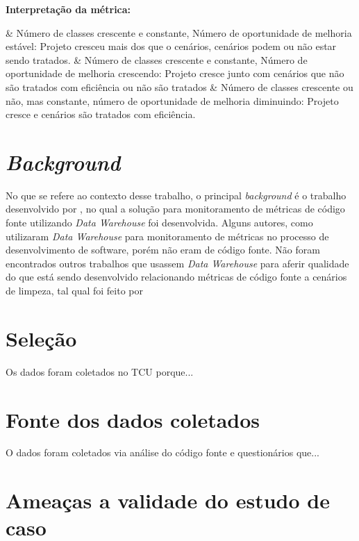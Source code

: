 \textbf{Interpretação da métrica: } 

\begin{easylist}[itemize]	
	& Número de classes crescente e constante, Número de oportunidade de melhoria estável: Projeto cresceu mais dos 	que o cenários, cenários podem ou não estar sendo tratados.
	& Número de classes crescente e constante, Número de oportunidade de melhoria crescendo: Projeto cresce junto 		com cenários que não são tratados com eficiência ou não são tratados
	& Número de classes crescente ou não, mas constante, número de oportunidade de melhoria diminuindo: Projeto 		cresce e cenários são tratados com eficiência.	
	\end{easylist}	

\section{\textit{Background}}

No que se refere ao contexto desse trabalho, o principal \textit{background} é o trabalho desenvolvido por , no qual a solução para monitoramento de métricas de código fonte utilizando \textit{Data Warehouse} foi desenvolvida. Alguns autores, como \cite{noveloo_uma_2006} utilizaram \textit{Data Warehouse} para monitoramento de métricas no processo de desenvolvimento de software, porém não eram de código fonte. Não foram encontrados outros trabalhos que usassem \textit{Data Warehouse} para aferir qualidade do que está sendo desenvolvido relacionando métricas de código fonte a cenários de limpeza, tal qual foi feito por 

\section{Seleção}

Os dados foram coletados no TCU porque...

\section{Fonte dos dados coletados}

O dados foram coletados via análise do código fonte e questionários que...

\section{Ameaças a validade do estudo de caso}

